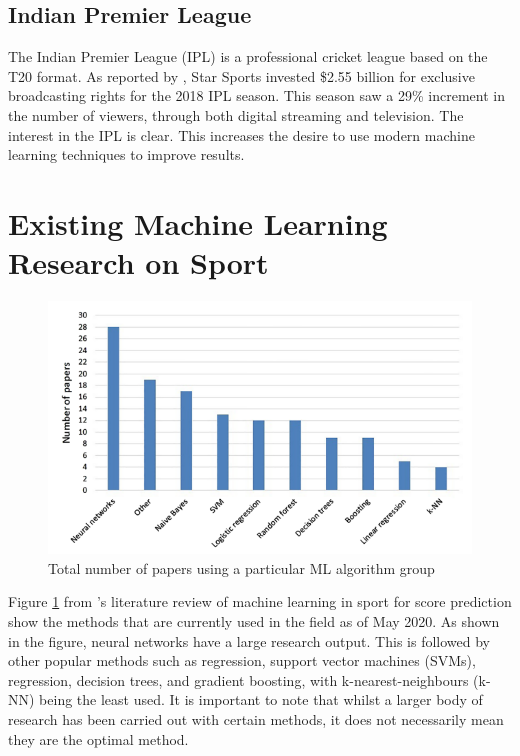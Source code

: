 \documentclass[12pt,a4paper]{report}
\theoremstyle{definition}
\begin{document}
\subsection{Indian Premier League} \label{sec:IPL}

The Indian Premier League (IPL) is a professional cricket league based on the T20 format.
As reported by \citet{ESPNcricinfo2018}, Star Sports invested \$2.55 billion for exclusive broadcasting rights for the 2018 IPL season. 
This season saw a 29\% increment in the number of viewers, through both digital streaming and television. 
The interest in the IPL is clear.
This increases the desire to use modern machine learning techniques to improve results.

\section{Existing Machine Learning Research on Sport} \label{sec:SportSurvey}

\begin{figure}[H]
    \centering
    \includegraphics[width=\linewidth]{Horvat&Job_Figure2.png}
    \caption{Total number of papers using a particular ML algorithm group \citep{horvat2020}}
    \label{fig:NoPapers}
\end{figure}

Figure \ref{fig:NoPapers} from \citet{horvat2020}'s literature review of machine learning in sport for score prediction show the methods that are currently used in the field as of May 2020. 
As shown in the figure, neural networks have a large research output.
This is followed by other popular methods such as regression, support vector machines (SVMs), regression, decision trees, and gradient boosting, with k-nearest-neighbours (k-NN) being the least used. 
It is important to note that whilst a larger body of research has been carried out with certain methods, it does not necessarily mean they are the optimal method.
\end{document}
